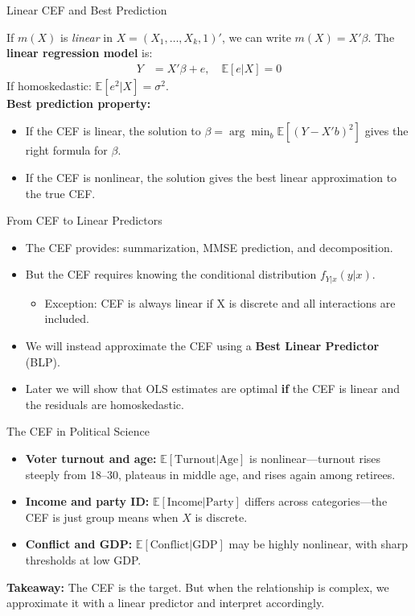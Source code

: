 \documentclass[aspectratio=169, handout, t]{beamer}
\numberwithin{equation}{section}
\begin{document}
\begin{frame}{Linear CEF and Best Prediction}

If $m(X)$ is \emph{linear} in $X=(X_1,\ldots,X_k,1)'$, we can write $m(X)=X'\beta$.  The \textbf{linear regression model} is:
\begin{align*}
Y&=X'\beta+e, \quad \mathbb{E}[e|X]=0
\end{align*}
If homoskedastic: $\mathbb{E}[e^2|X]=\sigma^2$.\\
\bigskip\pause
\textbf{Best prediction property:}
\begin{itemize}
\item If the CEF is linear, the solution to $\beta=\arg \min_b \mathbb{E}[(Y-X'b)^2]$ gives the right formula for $\beta$.
\item If the CEF is nonlinear, the solution gives the best linear approximation to the true CEF.
\end{itemize}
\end{frame}

\begin{frame}{From CEF to Linear Predictors}
\begin{itemize}
\item The CEF provides: summarization, MMSE prediction, and decomposition.\pause
\item But the CEF requires knowing the conditional distribution $f_{Y|x}(y|x)$.
\begin{itemize}
\item Exception: CEF is always linear if X is discrete and all interactions are included.
\end{itemize}\pause
\item We will instead approximate the CEF using a \textbf{Best Linear Predictor} (BLP).
\item Later we will show that OLS estimates are optimal \textbf{if} the CEF is linear and the residuals are homoskedastic.
\end{itemize}
\end{frame}

\begin{frame}{The CEF in Political Science}
\begin{itemize}
\item \textbf{Voter turnout and age:} $\mathbb{E}[\text{Turnout}|\text{Age}]$ is nonlinear---turnout rises steeply from 18--30, plateaus in middle age, and rises again among retirees.\pause
\item \textbf{Income and party ID:} $\mathbb{E}[\text{Income}|\text{Party}]$ differs across categories---the CEF is just group means when $X$ is discrete.\pause
\item \textbf{Conflict and GDP:} $\mathbb{E}[\text{Conflict}|\text{GDP}]$ may be highly nonlinear, with sharp thresholds at low GDP.
\end{itemize}
\bigskip
\textbf{Takeaway:} The CEF is the target. But when the relationship is complex, we approximate it with a linear predictor and interpret accordingly.
\end{frame}
\end{document}
